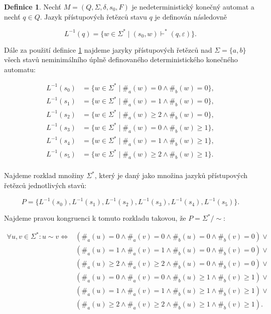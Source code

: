 \documentclass[a4paper, 12pt]{article}
\theoremstyle{definition}
\newtheorem{definition}{Definice}[section]
\theoremstyle{definition}
\theoremstyle{definition}
\theoremstyle{remark}
\begin{document}
\newpage
\begin{definition}
    \label{langdef}
    Nechť $M = (Q, \Sigma, \delta, s_0, F)$ je nedeterministický konečný automat a nechť $q \in Q$. Jazyk přístupových řetězců stavu $q$ je definován následovně

    $$L^{-1}(q) = \{w \in \Sigma^\ast \; | \; (s_0, w) \vdash^\ast (q, \varepsilon)\}.$$
\end{definition}

Dále za použití definice \ref{langdef} najdeme jazyky přístupových řetězců nad $\Sigma = \{a, b\}$ všech stavů neminimálního úplně definovaného deterministického konečného automatu:

\begin{align*}
    L^{-1}(s_0) &= \{w \in \Sigma^\ast \; | \; \#_a(w) = 0 \wedge \#_b(w) = 0\}, \\
    L^{-1}(s_1) &= \{w \in \Sigma^\ast \; | \; \#_a(w) = 1 \wedge \#_b(w) = 0\}, \\
    L^{-1}(s_2) &= \{w \in \Sigma^\ast \; | \; \#_a(w) \geq 2 \wedge \#_b(w) = 0\}, \\
    L^{-1}(s_3) &= \{w \in \Sigma^\ast \; | \; \#_a(w) = 0 \wedge \#_b(w) \geq 1\}, \\
    L^{-1}(s_4) &= \{w \in \Sigma^\ast \; | \; \#_a(w) = 1 \wedge \#_b(w) \geq 1\}, \\    
    L^{-1}(s_5) &= \{w \in \Sigma^\ast \; | \; \#_a(w) \geq 2 \wedge \#_b(w) \geq 1\}. \\
\end{align*}

Najdeme rozklad množiny $\Sigma^\ast$, který je daný jako množina jazyků přístupových řetězců jednotlivých stavů:

$$P = \{L^{-1}(s_0), L^{-1}(s_1), L^{-1}(s_2), L^{-1}(s_3), L^{-1}(s_4), L^{-1}(s_5)\}.$$

Najdeme pravou kongruenci k tomuto rozkladu takovou, že $P = \Sigma^\ast / \sim$:

\begin{align*}
    \forall u,v \in \Sigma^\ast: u \sim v \iff &(\#_a(u) = 0 \wedge \#_a(v) = 0 \wedge \#_b(u) = 0 \wedge \#_b(v) = 0) \lor \\
    &(\#_a(u) = 1 \wedge \#_a(v) = 1 \wedge \#_b(u) = 0 \wedge \#_b(v) = 0) \lor \\
    &(\#_a(u) \geq 2 \wedge \#_a(v) \geq 2 \wedge \#_b(u) = 0 \wedge \#_b(v) = 0) \lor \\
    &(\#_a(u) = 0 \wedge \#_a(v) = 0 \wedge \#_b(u) \geq 1 \wedge \#_b(v) \geq 1) \lor \\
    &(\#_a(u) = 1 \wedge \#_a(v) = 1 \wedge \#_b(u) \geq 1 \wedge \#_b(v) \geq 1) \lor \\    
    &(\#_a(u) \geq 2 \wedge \#_a(v) \geq 2 \wedge \#_b(u) \geq 1 \wedge \#_b(v) \geq 1). \\    
\end{align*}
\end{document}
